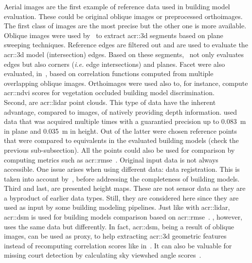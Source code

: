             Aerial images are the first example of reference data used in building model evaluation.
            These could be original oblique images or preprocessed orthoimages.
            The first class of images are the most precise but the other one is more available.
            Oblique images were used by~\textcite{michelin2013quality} to extract \gls{acr::3d} segments based on plane sweeping techniques.
            Reference edges are filtered out and are used to evaluate the \gls{acr::3d} model (intersection) edges.
            Based on these segments,~\textcite{boudet2006supervised} not only evaluates edges but also corners (\textit{i.e.} edge intersections) and planes.
            Facet were also evaluated, in~\parencite{boudet2006supervised}, based on correlation functions computed from multiple overlapping oblique images.
            Orthoimages were used also to, for instance, compute \gls{acr::ndvi} scores for vegetation occluded building model discrimination.\\

            Second, are \gls{acr::lidar} point clouds.
            This type of data have the inherent advantage, compared to images, of natively providing depth information.
            \textcite{kaartinen2005accuracy} used data that was acquired multiple times with a guarantied precision up to \SI{0.083}{\m} in plane and \SI{0.035}{\m} in height.
            Out of the latter were chosen reference points that were compared to equivalents in the evaluated building models (check the previous sub-subsection).
            All the points could also be used for comparison by computing metrics such as \gls{acr::rmse}~\parencite{lafarge2012creating,zhu2018large}.
            Original input data is not always accessible.
            One issue arises when using different data: data registration.
            This is taken into account by~\textcite{akca2010quality}, before addressing the completeness of building models.\\
            
            Third and last, are presented height maps.
            These are not sensor data as they are a byproduct of earlier data types.
            Still, they are considered here since they are used as input by some building modeling pipelines.
            Just like with \gls{acr::lidar}, \gls{acr::dsm} is used for building models comparison based on \gls{acr::rmse}~\parencite{zeng2018neural}.
            \textcite{michelin2013quality}, however, uses the same data but differently.
            In fact, \gls{acr::dsm}, being a result of oblique images, can be used as proxy, to help extracting \gls{acr::3d} geometric features instead of recomputing correlation scores like in~\parencite{boudet2006supervised}.
            It can also be valuable for missing court detection by calculating sky viewshed angle scores~\parencite{michelin2013quality}.

